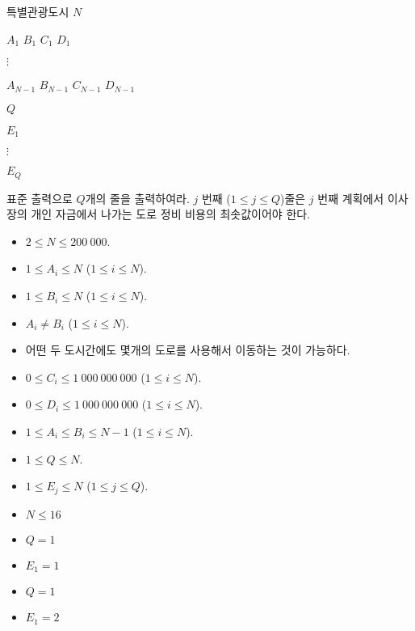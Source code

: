 \begin{problem}{특별관광도시}
	$N$
	
	$A_1$ $B_1$ $C_1$ $D_1$
	
	$\vdots$
	
	$A_{N-1}$ $B_{N-1}$ $C_{N-1}$ $D_{N-1}$

	$Q$
	
	$E_1$
	
	$\vdots$
	
	$E_Q$
	
	\OutputFile
	
	표준 출력으로 $Q$개의 줄을 출력하여라. $j$ 번째 ($1 \le j \le Q$)줄은 $j$ 번째 계획에서 이사장의 개인 자금에서 나가는 도로 정비 비용의 최솟값이어야 한다.
	
	\Constraints
	
	\begin{itemize}
	
	\item $2 \le N \le 200\ 000$.
	\item $1 \le A_i \le N$ ($1 \le i \le N$).
	\item $1 \le B_i \le N$ ($1 \le i \le N$).
	\item $A_i \ne B_i$ ($1 \le i \le N$).
	\item 어떤 두 도시간에도 몇개의 도로를 사용해서 이동하는 것이 가능하다.
	\item $0 \le C_i \le 1\ 000\ 000\ 000$ ($1 \le i \le N$).
	\item $0 \le D_i \le 1\ 000\ 000\ 000$ ($1 \le i \le N$).
	\item $1 \le A_i \le B_i \le N-1$ ($1 \le i \le N$).
	\item $1 \le Q \le N$.
	\item $1 \le E_j \le N$ ($1 \le j \le Q$).
		
	\end{itemize}
	
	
	\begin{itemize}
		\item $N \le 16$
	\end{itemize}
	
	\begin{itemize}
		\item $Q = 1$
		\item $E_1 = 1$
	\end{itemize}


	\begin{itemize}
		\item $Q = 1$
		\item $E_1 = 2$
	\end{itemize}
	

\end{problem}

